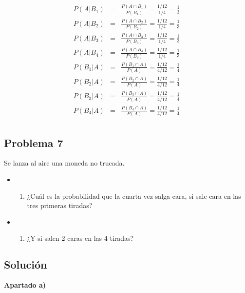 \documentclass[
]{article}
\providecommand{\tightlist}{%
  \setlength{\itemsep}{0pt}\setlength{\parskip}{0pt}}
\begin{document}
\begin{eqnarray*}
P(A|B_1) &=& \frac{P(A \cap B_1)}{P(B_1)} = \frac{1/12}{1/4} = \frac{1}{3}\\
P(A|B_2) &=& \frac{P(A \cap B_2)}{P(B_2)} = \frac{1/12}{1/4} = \frac{1}{3}\\
P(A|B_3) &=& \frac{P(A \cap B_3)}{P(B_3)} = \frac{1/12}{1/4} = \frac{1}{3}\\
P(A|B_4) &=& \frac{P(A \cap B_4)}{P(B_4)} = \frac{1/12}{1/4} = \frac{1}{3}\\
P(B_1|A) &=& \frac{P(B_1 \cap A)}{P(A)} = \frac{1/12}{4/12} = \frac{1}{4}\\
P(B_2|A) &=& \frac{P(B_2 \cap A)}{P(A)} = \frac{1/12}{4/12} = \frac{1}{4}\\
P(B_3|A) &=& \frac{P(B_3 \cap A)}{P(A)} = \frac{1/12}{4/12} = \frac{1}{4}\\
P(B_4|A) &=& \frac{P(B_4 \cap A)}{P(A)} = \frac{1/12}{4/12} = \frac{1}{4}\\
\end{eqnarray*}

\hypertarget{problema-7}{%
\subsection{Problema 7}\label{problema-7}}

Se lanza al aire una moneda no trucada.

\begin{itemize}
\item
  \begin{enumerate}
  \def\labelenumi{\alph{enumi})}
  \tightlist
  \item
    ¿Cuál es la probabilidad que la cuarta vez salga cara, si sale cara
    en las tres primeras tiradas?
  \end{enumerate}
\item
  \begin{enumerate}
  \def\labelenumi{\alph{enumi})}
  \setcounter{enumi}{1}
  \tightlist
  \item
    ¿Y si salen 2 caras en las 4 tiradas?
  \end{enumerate}
\end{itemize}

\hypertarget{soluciuxf3n-6}{%
\subsection{Solución}\label{soluciuxf3n-6}}

\textbf{Apartado a)}
\end{document}
